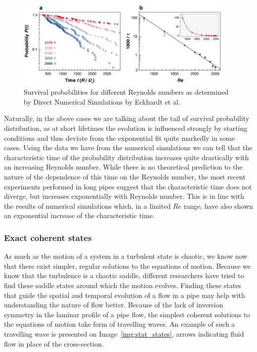 \documentclass[11pt,a4paper]{article}
\begin{document}
\begin{figure}[h]
    \centering
    \includegraphics[width=0.95\textwidth]{decay_prob.png}
    \caption{Survival probabilities for different Reynolds numbers as determined by Direct Numerical Simulations by Eckhardt et al\cite{Eckhardt02}.}\label{img:decay_plot}
\end{figure}

Naturally, in the above cases we are talking about the tail of survival probability distribution, as at short lifetimes the evolution is influenced strongly by starting conditions and thus deviate from the exponential fit quite markedly in some cases.
Using the data we have from the numerical simulations we can tell that the characteristic time of the probability distribution increases quite drastically with an increasing Reynolds number.
While there is no theoretical prediction to the nature of the dependence of this time on the Reynolds number, the most recent experiments performed in long pipes suggest that the characteristic time does not diverge, but increases exponentially with Reynolds number.
This is in line with the results of numerical simulations which, in a limited \(Re\) range, have also shown an exponential increase of the characteristic time.

\subsubsection{Exact coherent states}
As much as the motion of a system in a turbulent state is chaotic, we know now that there exist simpler, regular solutions to the equations of motion.
Because we know that the turbulence is a chaotic saddle, different researchers have tried to find these saddle states around which the motion evolves\cite{Clever92}\cite{Clever97}\cite{Nagata90}\cite{Faisst00}.
Finding these states that guide the spatial and temporal evolution of a flow in a pipe may help with understanding the nature of flow better.
Because of the lack of inversion symmetry in the laminar profile of a pipe flow, the simplest coherent solutions to the equations of motion take form of travelling waves.
An example of such a travelling wave is presented on Image~\ref{img:stat_states}, arrows indicating fluid flow in place of the cross-section.
\end{document}
